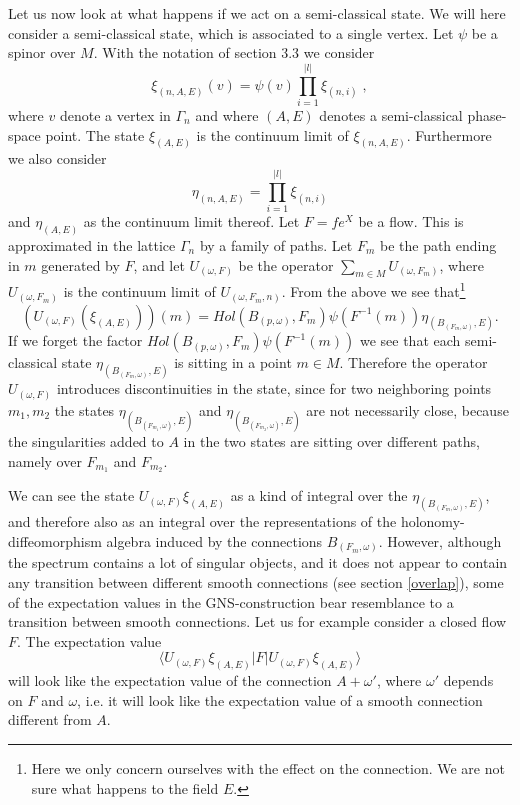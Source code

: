 \documentclass[12pt]{article}
\begin{document}
Let us now look at what happens if we act on a semi-classical state. We will here consider a semi-classical state, which is associated to a single vertex. Let $\psi$ be a spinor over $M$. With the notation of section 3.3 we consider 
$$
\xi_{(n,A,E)}(v)=\psi (v)\prod_{i=1}^{|l|}\xi_{(n,i)}\;,
$$
where $v$ denote a vertex in $\Gamma_n$ and where $(A,E)$ denotes a semi-classical phase-space point.  The state $\xi_{(A,E)}$ is the continuum limit of $\xi_{(n,A,E)}$. Furthermore we also consider 
$$
\eta_{(n,A,E)}=\prod_{i=1}^{|l|}\xi_{(n,i)}
$$ 
and $\eta_{(A,E)}$ as the continuum limit thereof.
%
%
Let $F= f e^X$ be a flow. This is approximated in the lattice $\Gamma_n$ by a family of paths. Let $F_m$ be the  path ending in $m$ generated by $F$, and let $U_{(\omega,F)}$ be the operator $\sum_{m\in M} U_{(\omega,F_m)}  $, where $U_{(\omega,F_m)} $ is the continuum limit of $U_{(\omega,F_m,n)} $.  From the above we see that\footnote{Here we only concern ourselves with the effect on the connection. We are not sure what happens to the field $E$.}  
$$   (U_{(\omega,F)}  (\xi_{(A,E)}))(m)= Hol (B_{(p,\omega)}, F_m)\psi (F^{-1}(m)) \eta_{(B_{(F_m,\omega)},E)} .  $$
%
If we forget the factor $Hol (B_{(p,\omega)}, F_m)\psi (F^{-1}(m))$ we see that each semi-classical state $\eta_{(B_{(F_m,\omega)},E)}$ is sitting in a point $m\in M$. Therefore the operator $U_{(\omega,F)}$ introduces discontinuities in the state, since for two neighboring points $m_1,m_2$ the states $\eta_{(B_{(F_{m_1},\omega)},E)}$ and $\eta_{(B_{(F_{m_2},\omega)},E)}$ are not necessarily close, because the singularities added to $A$ in the two states are sitting over different paths, namely over $F_{m_1}$ and $F_{m_2}$. 



We can see the state $U_{(\omega,F)}\xi_{(A,E)}$ as a kind of integral over the $\eta_{(B_{(F_m,\omega)},E)}$, and therefore also as an integral over the representations of the holonomy-diffeomorphism algebra induced by the connections $B_{(F_m,\omega)}$. However, although the spectrum contains a lot of singular objects, and it does not appear to contain any transition between different smooth connections (see section \ref{overlap}), some of the expectation values in the GNS-construction bear resemblance to a transition between smooth connections. Let us for example consider a closed flow $F$. The expectation value
$$ \langle U_{(\omega,F)}\xi_{(A,E)} |F  | U_{(\omega,F)}\xi_{(A,E)} \rangle $$
will look like the expectation value of the connection $A+\omega' $, where $\omega'$ depends on $F$ and $\omega$, i.e. it will look like the expectation value of a smooth connection different from $A$.    
\end{document}
